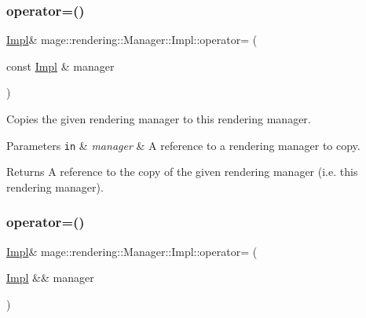 \subsubsection{\texorpdfstring{operator=()}{operator=()}\hspace{0.1cm}{\footnotesize\ttfamily [1/2]}}
{\footnotesize\ttfamily \hyperlink{classmage_1_1rendering_1_1_manager_1_1_impl}{Impl}\& mage\+::rendering\+::\+Manager\+::\+Impl\+::operator= (\begin{DoxyParamCaption}\item[{const \hyperlink{classmage_1_1rendering_1_1_manager_1_1_impl}{Impl} \&}]{manager }\end{DoxyParamCaption})\hspace{0.3cm}{\ttfamily [delete]}}

Copies the given rendering manager to this rendering manager.


\begin{DoxyParams}[1]{Parameters}
\mbox{\tt in}  & {\em manager} & A reference to a rendering manager to copy. \\
\hline
\end{DoxyParams}
\begin{DoxyReturn}{Returns}
A reference to the copy of the given rendering manager (i.\+e. this rendering manager). 
\end{DoxyReturn}
\hypertarget{classmage_1_1rendering_1_1_manager_1_1_impl_a3dfc877c5737abc5020cf700dec8eb60}{}\label{classmage_1_1rendering_1_1_manager_1_1_impl_a3dfc877c5737abc5020cf700dec8eb60} 
\subsubsection{\texorpdfstring{operator=()}{operator=()}\hspace{0.1cm}{\footnotesize\ttfamily [2/2]}}
{\footnotesize\ttfamily \hyperlink{classmage_1_1rendering_1_1_manager_1_1_impl}{Impl}\& mage\+::rendering\+::\+Manager\+::\+Impl\+::operator= (\begin{DoxyParamCaption}\item[{\hyperlink{classmage_1_1rendering_1_1_manager_1_1_impl}{Impl} \&\&}]{manager }\end{DoxyParamCaption})\hspace{0.3cm}{\ttfamily [delete]}}


